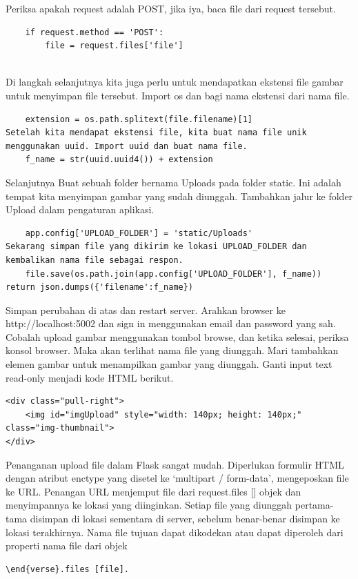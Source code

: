 Periksa apakah request adalah POST, jika iya, baca file dari request tersebut.
\begin{verbatim}    
	if request.method == 'POST':
        file = request.files['file']
        
\end{verbatim}
Di langkah selanjutnya kita juga perlu untuk mendapatkan ekstensi file gambar untuk menyimpan file tersebut. Import os dan bagi nama ekstensi dari nama file.
\begin{verbatim}    
	extension = os.path.splitext(file.filename)[1]
Setelah kita mendapat ekstensi file, kita buat nama file unik menggunakan uuid. Import uuid dan buat nama file.
	f_name = str(uuid.uuid4()) + extension
\end{verbatim}
Selanjutnya Buat sebuah folder bernama Uploads pada folder static. Ini adalah tempat kita menyimpan gambar yang sudah diunggah. Tambahkan jalur ke folder Upload dalam pengaturan aplikasi.
\begin{verbatim}
	app.config['UPLOAD_FOLDER'] = 'static/Uploads'
Sekarang simpan file yang dikirim ke lokasi UPLOAD_FOLDER dan kembalikan nama file sebagai respon.
	file.save(os.path.join(app.config['UPLOAD_FOLDER'], f_name))
return json.dumps({'filename':f_name})
\end{verbatim}
Simpan perubahan di atas dan restart server. Arahkan browser ke http://localhost:5002 dan sign in menggunakan email dan password yang sah. Cobalah upload gambar menggunakan tombol browse, dan ketika selesai, periksa konsol browser. Maka akan terlihat nama file yang diunggah.
Mari tambahkan elemen gambar untuk menampilkan gambar yang diunggah. Ganti input text read-only menjadi kode HTML berikut.
\begin{verbatim}
<div class="pull-right">
    <img id="imgUpload" style="width: 140px; height: 140px;" class="img-thumbnail">
</div>
\end{verbatim}
Penanganan upload file dalam Flask sangat mudah. Diperlukan formulir HTML dengan atribut enctype yang disetel ke ‘multipart / form-data’, mengeposkan file ke URL. Penangan URL menjemput file dari request.files [] objek dan menyimpannya ke lokasi yang diinginkan. Setiap file yang diunggah pertama-tama disimpan di lokasi sementara di server, sebelum benar-benar disimpan ke lokasi terakhirnya. Nama file tujuan dapat dikodekan atau dapat diperoleh dari properti nama file dari objek 
\begin{verbatim}
\end{verse}.files [file]. 
\end{verbatim}
